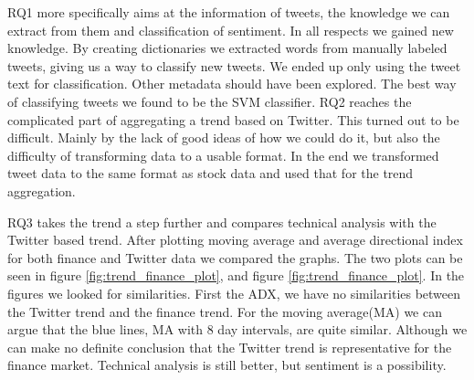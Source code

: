 RQ1 more specifically aims at the information of tweets, the knowledge we
can extract from them and classification of sentiment. In all respects we
gained new knowledge. By creating dictionaries we extracted words from
manually labeled tweets, giving us a way to classify new tweets. We ended up
only using the tweet text for classification. Other metadata should have been
explored. The best way of classifying tweets we found to be the SVM classifier.    
RQ2 reaches the complicated part of aggregating a trend based on Twitter. This
turned out to be difficult. Mainly by the lack of good ideas of how we could do
it, but also the difficulty of transforming data to a usable format. In the end
we transformed tweet data to the same format as stock data and used that for
the trend aggregation. 

RQ3 takes the trend a step further and compares technical analysis with the
Twitter based trend. After plotting moving average and average directional
index for both finance and Twitter data we compared the graphs. The two plots
can be seen in figure \ref{fig:trend_finance_plot}, and figure
\ref{fig:trend_finance_plot}. In the figures we looked for similarities. 
First the ADX, we have no similarities between the Twitter trend and the
finance trend. For the moving average(MA) we can argue that the blue lines, MA
with 8 day intervals, are quite similar. Although we can make no definite
conclusion that the Twitter trend is representative for the finance market.
Technical analysis is still better, but sentiment is a possibility. 
%
